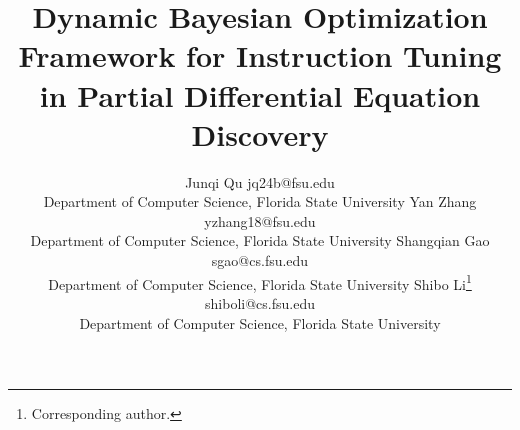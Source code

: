\documentclass[twoside,11pt]{article}
\begin{document}
\title{Dynamic Bayesian Optimization Framework for Instruction Tuning in Partial Differential Equation Discovery}



\author{
\name Junqi Qu \email jq24b@fsu.edu \\
\addr Department of Computer Science, Florida State University
\AND
\name Yan Zhang \email yzhang18@fsu.edu \\
\addr Department of Computer Science, Florida State University
\AND
\name Shangqian Gao \email sgao@cs.fsu.edu \\
\addr Department of Computer Science, Florida State University
\AND
\name Shibo Li\thanks{Corresponding author.} \email shiboli@cs.fsu.edu \\
\addr Department of Computer Science, Florida State University
}


\begingroup
\renewcommand\thefootnote{\fnsymbol{footnote}} 
\maketitle
\endgroup


%
%
%
%
%
%















\clearpage
\appendix


\end{document}
